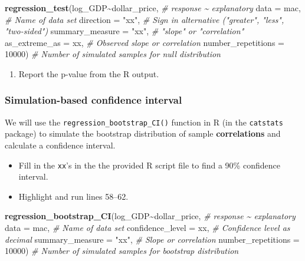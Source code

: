 \documentclass[
]{report}
\newenvironment{Shaded}{\begin{snugshade}}{\end{snugshade}}
\newcommand{\AttributeTok}[1]{\textcolor[rgb]{0.13,0.29,0.53}{#1}}
\newcommand{\CommentTok}[1]{\textcolor[rgb]{0.56,0.35,0.01}{\textit{#1}}}
\newcommand{\DecValTok}[1]{\textcolor[rgb]{0.00,0.00,0.81}{#1}}
\newcommand{\FunctionTok}[1]{\textcolor[rgb]{0.13,0.29,0.53}{\textbf{#1}}}
\newcommand{\NormalTok}[1]{#1}
\newcommand{\SpecialCharTok}[1]{\textcolor[rgb]{0.81,0.36,0.00}{\textbf{#1}}}
\newcommand{\StringTok}[1]{\textcolor[rgb]{0.31,0.60,0.02}{#1}}
\providecommand{\tightlist}{%
  \setlength{\itemsep}{0pt}\setlength{\parskip}{0pt}}
\begin{document}
\begin{Shaded}
\begin{Highlighting}[]
\FunctionTok{regression\_test}\NormalTok{(log\_GDP}\SpecialCharTok{\textasciitilde{}}\NormalTok{dollar\_price, }\CommentTok{\# response \textasciitilde{} explanatory}
               \AttributeTok{data =}\NormalTok{ mac, }\CommentTok{\# Name of data set}
               \AttributeTok{direction =} \StringTok{"xx"}\NormalTok{, }\CommentTok{\# Sign in alternative ("greater", "less", "two{-}sided")}
               \AttributeTok{summary\_measure  =} \StringTok{"xx"}\NormalTok{, }\CommentTok{\# "slope" or "correlation"}
               \AttributeTok{as\_extreme\_as =}\NormalTok{ xx, }\CommentTok{\# Observed slope or correlation}
               \AttributeTok{number\_repetitions =} \DecValTok{10000}\NormalTok{) }\CommentTok{\# Number of simulated samples for null distribution}
\end{Highlighting}
\end{Shaded}

\begin{enumerate}
\def\labelenumi{\arabic{enumi}.}
\setcounter{enumi}{9}
\tightlist
\item
  Report the p-value from the R output.
  \vspace{0.3in}
\end{enumerate}

\newpage

\subsubsection*{Simulation-based confidence interval}\label{simulation-based-confidence-interval-3}

We will use the \texttt{regression\_bootstrap\_CI()} function in R (in the \texttt{catstats} package) to simulate the bootstrap distribution of sample \textbf{correlations} and calculate a confidence interval.

\begin{itemize}
\item
  Fill in the \texttt{xx}'s in the the provided R script file to find a 90\% confidence interval.
\item
  Highlight and run lines 58--62.
\end{itemize}

\begin{Shaded}
\begin{Highlighting}[]
\FunctionTok{regression\_bootstrap\_CI}\NormalTok{(log\_GDP}\SpecialCharTok{\textasciitilde{}}\NormalTok{dollar\_price, }\CommentTok{\# response \textasciitilde{} explanatory}
   \AttributeTok{data =}\NormalTok{ mac, }\CommentTok{\# Name of data set}
   \AttributeTok{confidence\_level =}\NormalTok{ xx, }\CommentTok{\# Confidence level as decimal}
   \AttributeTok{summary\_measure =} \StringTok{"xx"}\NormalTok{, }\CommentTok{\# Slope or correlation}
   \AttributeTok{number\_repetitions =} \DecValTok{10000}\NormalTok{) }\CommentTok{\# Number of simulated samples for bootstrap distribution}
\end{Highlighting}
\end{Shaded}
\end{document}
